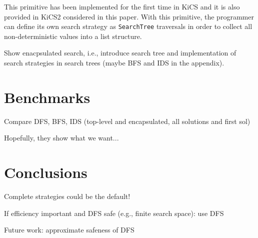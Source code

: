 \documentclass[english]{lni}
\newcommand{\code}[1]{\texttt{#1}}
\begin{document}
This primitive has been implemented for the first time
in KiCS \cite{BrasselHuch07,BrasselHuch09}
and it is also provided in KiCS2 \cite{BrasselHanusPeemoellerReck11}
considered in this paper.
With this primitive,
the programmer can define its own search strategy as
\code{SearchTree} traversals in order to
collect all non-deterministic values into a list structure.



Show enacpsulated search, i.e., introduce search tree
and implementation of search strategies in search trees
(maybe BFS and IDS in the appendix).

\section{Benchmarks}
\label{sec:benchmarks}

Compare DFS, BFS, IDS (top-level and encapsulated, all solutions and first sol)

Hopefully, they show what we want...

\section{Conclusions}
\label{sec:conclusions}

Complete strategies could be the default!

If efficiency important and DFS safe (e.g., finite search space): use DFS

Future work: approximate safeness of DFS



%
\end{document}
